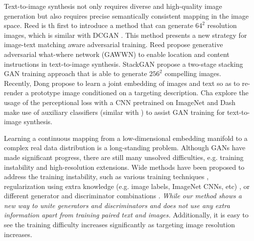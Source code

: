 \documentclass[10pt,twocolumn,letterpaper]{article}
\begin{document}
Text-to-image synthesis not only requires diverse and high-quality image generation but also requires precise semantically consistent mapping in the image space.  Reed \etal \cite{reed2016generative}  is th first to introduce a method that can generate $64^2$ resolution images, which is similar with DCGAN \cite{radford2015unsupervised}. This method presents a new strategy for image-text matching aware adversarial training. Reed \etal \cite{reed2016learning} propose generative
adversarial what-where network (GAWWN) to enable location and content instructions in text-to-image synthesis. StackGAN \etal \cite{han2017stackgan} propose a two-stage stacking GAN training approach that is able to generate $256^2$ compelling images. Recently, Dong \etal \cite{dong2017semantic} propose to learn a joint embedding of images and text so as to re-render a prototype image conditioned on a targeting description. Cha \etal \cite{char2017perceptual} explore the usage of the perceptional loss with a CNN pretrained on ImageNet \cite{johnson2016perceptual} and Dash \etal \cite{dash2017tac} make use of auxiliary classifiers (similar with \cite{odena2016conditional}) to assist GAN training for text-to-image synthesis. 
	
Learning a continuous mapping from a low-dimensional embedding manifold to a complex real data distribution is a long-standing problem. Although GANs have made significant progress, there are still many unsolved difficulties, e.g. training instability and high-resolution extensions. Wide methods have been proposed to address the training instability, such as various training techniques \cite{salimans2016improved,arjovsky2017wasserstein,berthelot2017began,shrivastava2016learning,odena2016conditional}, regularization using extra knowledge (e.g. image labels, ImageNet CNNs, etc) \cite{dosovitskiy2016generating,ledig2016photo,dash2017tac,dash2017tac}, or different generator and discriminator combinations  \cite{metz2016unrolled,durugkar2016generative,yang2017lr,huang2016stacked}. \textit{While our method shows a new way to unite generators and discriminators and does not use any extra information apart from training paired text and images.} Additionally, it is easy to see the training difficulty increases significantly as targeting image resolution increases.

\end{document}
